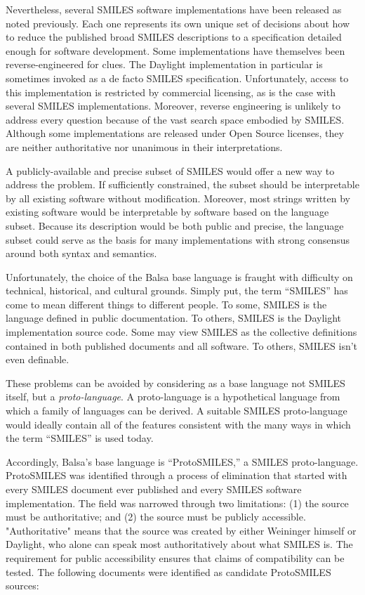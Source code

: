 \documentclass{article}
\begin{document}
Nevertheless, several SMILES software implementations have been released as noted previously. Each one represents its own unique set of decisions about how to reduce the published broad SMILES descriptions to a specification detailed enough for software development. Some implementations have themselves been reverse-engineered for clues. The Daylight implementation in particular is sometimes invoked as a de facto SMILES specification. Unfortunately, access to this implementation is restricted by commercial licensing, as is the case with several SMILES implementations. Moreover, reverse engineering is unlikely to address every question because of the vast search space embodied by SMILES. Although some implementations are released under Open Source licenses, they are neither authoritative nor unanimous in their interpretations.

A publicly-available and precise subset of SMILES would offer a new way to address the problem. If sufficiently constrained, the subset should be interpretable by all existing software without modification. Moreover, most strings written by existing software would be interpretable by software based on the language subset. Because its description would be both public and precise, the language subset could serve as the basis for many implementations with strong consensus around both syntax and semantics.

Unfortunately, the choice of the Balsa base language is fraught with difficulty on technical, historical, and cultural grounds. Simply put, the term \enquote{SMILES} has come to mean different things to different people. To some, SMILES is the language defined in public documentation. To others, SMILES is the Daylight implementation source code. Some may view SMILES as the collective definitions contained in both published documents and all software. To others, SMILES isn't even definable.

These problems can be avoided by considering as a base language not SMILES itself, but a \textit{proto-language}. A proto-language is a hypothetical language from which a family of languages can be derived. A suitable SMILES proto-language would ideally contain all of the features consistent with the many ways in which the term \enquote{SMILES} is used today.

Accordingly, Balsa's base language is \enquote{ProtoSMILES,} a SMILES proto-language. ProtoSMILES was identified through a process of elimination that started with every SMILES document ever published and every SMILES software implementation. The field was narrowed through two limitations: (1) the source must be authoritative; and (2) the source must be publicly accessible. "Authoritative" means that the source was created by either Weininger himself or Daylight, who alone can speak most authoritatively about what SMILES is. The requirement for public accessibility ensures that claims of compatibility can be tested. The following documents were identified as candidate ProtoSMILES sources:
\end{document}
